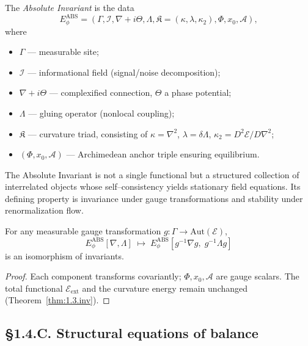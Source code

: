 \begin{definition}
The \emph{Absolute Invariant} is the data
\[
E_\phi^{\mathrm{ABS}}=
(\Gamma, \mathcal{I}, \nabla+i\Theta, \Lambda, 
 \mathfrak{K}=(\kappa,\lambda,\kappa_2),
 \Phi, x_0, \mathcal{A}),
\]
where
\begin{itemize}
\item $\Gamma$ — measurable site;
\item $\mathcal{I}$ — informational field (signal/noise decomposition);
\item $\nabla+i\Theta$ — complexified connection, $\Theta$ a phase potential;
\item $\Lambda$ — gluing operator (nonlocal coupling);
\item $\mathfrak{K}$ — curvature triad, consisting of 
  $\kappa=\nabla^2$, $\lambda=\delta\Lambda$, $\kappa_2=D^2\mathcal E/D\nabla^2$;
\item $(\Phi, x_0, \mathcal A)$ — Archimedean anchor triple ensuring equilibrium.
\end{itemize}
\end{definition}

\begin{remark}
The Absolute Invariant is not a single functional but a structured collection of interrelated objects whose self–consistency yields stationary field equations. 
Its defining property is invariance under gauge transformations and stability under renormalization flow.
\end{remark}

\begin{lemma}
For any measurable gauge transformation $g:\Gamma\to \mathrm{Aut}(\mathcal E)$,
\[
E_\phi^{\mathrm{ABS}}[\nabla,\Lambda]\;\longmapsto\;
E_\phi^{\mathrm{ABS}}[g^{-1}\nabla g,\;g^{-1}\Lambda g]
\]
is an isomorphism of invariants.
\end{lemma}

\begin{proof}
Each component transforms covariantly; $\Phi, x_0,\mathcal A$ are gauge scalars. 
The total functional $\mathcal E_{\mathrm{ext}}$ and the curvature energy remain unchanged (Theorem~\ref{thm:1.3.inv}).
\end{proof}

\subsection*{§1.4.C. Structural equations of balance}

